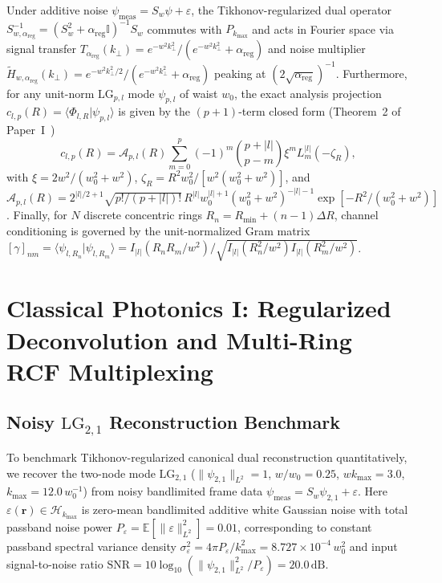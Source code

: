 \documentclass[aps,pra,reprint,nofootinbib,floatfix,longbibliography]{revtex4-2}
\newcommand{\braket}[2]{\langle #1 | #2 \rangle}
\newcommand{\norm}[1]{\lVert #1 \rVert}
\newcommand{\abs}[1]{\lvert #1 \rvert}
\begin{document}
Under additive noise $\psi_{\mathrm{meas}} = S_w\psi + \varepsilon$, the Tikhonov-regularized dual operator $S_{w,\alpha_{\mathrm{reg}}}^{-1} = (S_w^2 + \alpha_{\mathrm{reg}}\mathbb{I})^{-1}S_w$ commutes with $P_{k_{\max}}$ and acts in Fourier space via signal transfer $T_{\alpha_{\mathrm{reg}}}(k_\perp) = e^{-w^2 k_\perp^2}/(e^{-w^2 k_\perp^2}+\alpha_{\mathrm{reg}})$ and noise multiplier $\widetilde{H}_{w,\alpha_{\mathrm{reg}}}(k_\perp) = e^{-w^2 k_\perp^2/2}/(e^{-w^2 k_\perp^2}+\alpha_{\mathrm{reg}})$ peaking at $(2\sqrt{\alpha_{\mathrm{reg}}})^{-1}$. Furthermore, for any unit-norm $\mathrm{LG}_{p,l}$ mode $\psi_{p,l}$ of waist $w_0$, the exact analysis projection $c_{l,p}(R) = \braket{\Phi_{l,R}}{\psi_{p,l}}$ is given by the $(p+1)$-term closed form (Theorem~2 of Paper~I~\cite{AyalaPaperI})
\begin{equation}
c_{l,p}(R) = \mathcal{A}_{p,l}(R) \sum_{m=0}^p (-1)^m \binom{p+\abs{l}}{p-m} \xi^m L_m^{\abs{l}}(-\zeta_R),
\label{eq:c_lp_recap}
\end{equation}
with $\xi = 2w^2/(w_0^2+w^2)$, $\zeta_R = R^2 w_0^2/[w^2(w_0^2+w^2)]$, and $\mathcal{A}_{p,l}(R) = 2^{\abs{l}/2+1}\sqrt{p!/(p+\abs{l})!}\,\allowbreak R^{\abs{l}}w_0^{\abs{l}+1}(w_0^2+w^2)^{-\abs{l}-1}\allowbreak \exp[-R^2/(w_0^2+w^2)]$. Finally, for $N$ discrete concentric rings $R_n = R_{\min} + (n-1)\Delta R$, channel conditioning is governed by the unit-normalized Gram matrix $[\gamma]_{nm} = \braket{\psi_{l,R_n}}{\psi_{l,R_m}} = \allowbreak I_{\abs{l}}(R_n R_m/w^2)/\allowbreak \sqrt{I_{\abs{l}}(R_n^2/w^2)I_{\abs{l}}(R_m^2/w^2)}$.

\section{Classical Photonics I: Regularized Deconvolution and Multi-Ring RCF Multiplexing}
\label{sec:classical_sdm}

\subsection{Noisy \texorpdfstring{$\mathrm{LG}_{2,1}$}{LG\_\{2,1\}} Reconstruction Benchmark}
\label{subsec:noisy_lg21}

To benchmark Tikhonov-regularized canonical dual reconstruction quantitatively, we recover the two-node mode $\mathrm{LG}_{2,1}$ ($\norm{\psi_{2,1}}_{L^2} = 1$, $w/w_0 = 0.25$, $w k_{\max} = 3.0$, $k_{\max} = 12.0\,w_0^{-1}$) from noisy bandlimited frame data $\psi_{\mathrm{meas}} = S_w\psi_{2,1} + \varepsilon$. Here $\varepsilon(\mathbf{r}) \in \mathcal{H}_{k_{\max}}$ is zero-mean bandlimited additive white Gaussian noise with total passband noise power $P_\varepsilon = \mathbb{E}[\norm{\varepsilon}_{L^2}^2] = 0.01$, corresponding to constant passband spectral variance density $\sigma_\varepsilon^2 = 4\pi P_\varepsilon/k_{\max}^2 = 8.727\times 10^{-4}\,w_0^2$ and input signal-to-noise ratio $\mathrm{SNR} = 10\log_{10}(\norm{\psi_{2,1}}_{L^2}^2/P_\varepsilon) = 20.0\,\mathrm{dB}$.
\end{document}
